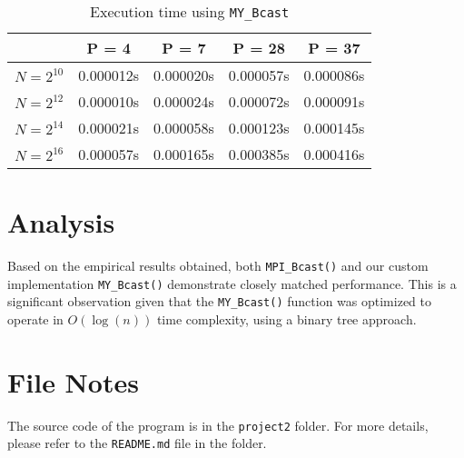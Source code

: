 \documentclass[12pt,a4paper]{article}
\begin{document}
\begin{table}[!htb]
    \centering
    \begin{tabular}{|c|c|c|c|c|}
    \hline
    & P = 4 & P = 7 & P = 28 & P = 37 \\
    \hline
    $N = 2^{10}$ & 0.000012s & 0.000020s & 0.000057s & 0.000086s \\
    \hline
    $N = 2^{12}$ & 0.000010s & 0.000024s & 0.000072s & 0.000091s \\
    \hline
    $N = 2^{14}$ & 0.000021s & 0.000058s & 0.000123s & 0.000145s \\
    \hline
    $N = 2^{16}$ & 0.000057s & 0.000165s & 0.000385s & 0.000416s \\
    \hline
    \end{tabular}
    \caption{Execution time using \texttt{MY\_Bcast}}
    \end{table}

\section{Analysis}

Based on the empirical results obtained, 
both \texttt{MPI\_Bcast()} and our custom implementation \texttt{MY\_Bcast()} demonstrate closely matched performance. 
This is a significant observation given that the \texttt{MY\_Bcast()} function was optimized to operate in \(O(\log(n))\) time complexity, 
using a binary tree approach.

\section*{File Notes}
The source code of the program is in the \texttt{project2} folder. 
For more details, please refer to the \texttt{README.md} file in the folder.
\end{document}
